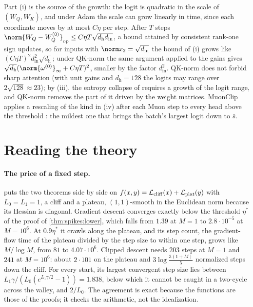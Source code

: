 \begin{refsection}
Part (i) is the source of the growth: the logit is quadratic in the scale of $(W_Q,W_K)$, and under Adam the scale can grow linearly in time, since each coordinate moves by at most $C\eta$ per step. After $T$ steps $\norm{W_Q-W_Q^{(0)}}_{\op}\le C\eta T\sqrt{d_{\mathrm h}d_{\mathrm{in}}}$, a bound attained by consistent rank-one sign updates, so for inputs with $\norm x_2=\sqrt{d_{\mathrm{in}}}$ the bound of (i) grows like $(C\eta T)^2d_{\mathrm{in}}^2\sqrt{d_{\mathrm h}}$; under QK-norm the same argument applied to the gains gives $\sqrt{d_{\mathrm h}}(\norm{\omega^{(0)}}_\infty+C\eta T)^2$, smaller by the factor $d_{\mathrm{in}}^2$. QK-norm does not forbid sharp attention (with unit gains and $d_{\mathrm h}=128$ the logits may range over $2\sqrt{128}\approx23$); by (iii), the entropy collapse of \textcite{ZhaiEtAl2023} requires a growth of the logit range, and QK-norm removes the part of it driven by the weight matrices. MuonClip applies a rescaling of the kind in (iv) after each Muon step to every head above the threshold \parencite{KimiTeam2025}: the mildest one that brings the batch's largest logit down to $\bar s$.

\section{Reading the theory}\label{sec:spikes:reading}

\paragraph{The price of a fixed step.}  puts the two theorems side by side on $f(x,y)=\mathcal{L}_{\mathrm{cliff}}(x)+\mathcal{L}_{\mathrm{plat}}(y)$ with $L_0=L_1=1$, a cliff and a plateau, $(1,1)$-smooth in the Euclidean norm because its Hessian is diagonal. Gradient descent converges exactly below the threshold $\eta^*$ of the proof of \cref{thm:spikes:lower}, which falls from $1.39$ at $M=1$ to $2.8\cdot10^{-5}$ at $M=10^6$. At $0.9\eta^*$ it crawls along the plateau, and its step count, the gradient-flow time of the plateau divided by the step size to within one step, grows like $M/\log M$, from $81$ to $4.07\cdot10^6$. Clipped descent needs $203$ steps at $M=1$ and $241$ at $M=10^6$: about $2\cdot101$ on the plateau and $3\log\frac{3(1+M)}5$ normalized steps down the cliff. For every start, its largest convergent step size lies between $L_1\gamma/(L_0(e^{L_1\gamma/2}-1))=1.838$, below which it cannot be caught in a two-cycle across the valley, and $2/L_0$. The agreement is exact because the functions are those of the proofs; it checks the arithmetic, not the idealization.


\end{refsection}
